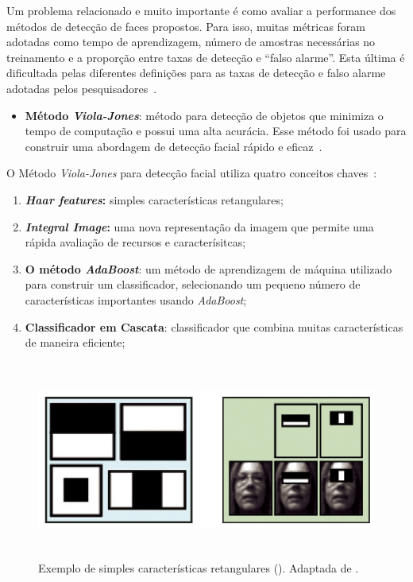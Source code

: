 Um problema relacionado e muito importante é como avaliar a performance dos métodos de detecção de faces propostos. Para isso, muitas métricas foram adotadas como tempo de aprendizagem, número de amostras necessárias no treinamento e a proporção entre taxas de detecção e ``falso alarme''. Esta última é dificultada pelas diferentes definições para as taxas de detecção e falso alarme adotadas pelos pesquisadores~\cite{yang}.
	
	\begin{itemize}
		\item \textbf{Método \textit{Viola-Jones}}: método para detecção de objetos que minimiza o tempo de computação e possui uma alta acurácia. Esse método foi usado para construir uma abordagem de detecção facial rápido e eficaz~\cite{violajones}.
	\end{itemize}

O Método \textit{Viola-Jones} para detecção facial utiliza quatro conceitos chaves~\cite{servodetection,violajones}:
	
	\begin{enumerate}
		\item \textbf{\textit{Haar features}:} simples características retangulares;
		\item \textbf{\textit{Integral Image}:} uma nova representação da imagem que permite uma rápida avaliação de recursos e caracterísitcas;
		\item \textbf{O método \textit{AdaBoost}}: um método de aprendizagem de máquina utilizado para construir um classificador,  selecionando um pequeno número de características importantes usando \textit{AdaBoost};
		\item \textbf{Classificador em Cascata}: classificador que combina muitas características de maneira eficiente;
	\end{enumerate}

	\begin{figure}[hbt]
		\begin{center}
			\includegraphics[height=6.5cm,width=12.5cm]{figuras/2.FundamentacaoTeorica/haar_features.png}
		\end{center}
		\caption{Exemplo de simples características retangulares (). Adaptada de \cite{servodetection}.}
		\label{haarfeatures}
	\end{figure}

